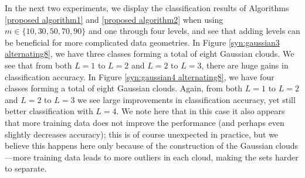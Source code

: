 \documentclass[twoside,11pt]{article}
\newcommand{\edit}[1]{{{#1}}}
\begin{document}
In the next two experiments, we display the classification results of Algorithms \ref{proposed algorithm1} and \ref{proposed algorithm2} when using $m\in\{10,30,50,70,90\}$ and one through four \edit{level}s, and see that adding \edit{level}s can be beneficial for more complicated data geometries.
In Figure \ref{syn:gaussian3 alternating8}, we have three classes forming a total of eight Gaussian clouds. We see that from both $L=1$ to $L=2$ and $L=2$ to $L=3$, there are huge gains in classification accuracy. In Figure \ref{syn:gaussian4 alternating8}, we have four classes forming a total of eight Gaussian clouds. Again, from both $L=1$ to $L=2$ and $L=2$ to $L=3$ we see large improvements in classification accuracy, yet still better classification with $L=4$. We note here that in this case it also appears that more training data does not improve the performance (and perhaps even slightly decreases accuracy); this is of course unexpected in practice, but we believe this happens here only because of the construction of the Gaussian clouds---more training data leads to more outliers in each cloud, making the sets harder to separate. 
\end{document}
